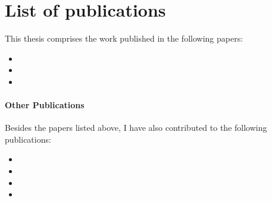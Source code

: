 \section{List of publications\label{sec:publications}}
This thesis comprises the work published in the following papers:

\begin{itemize}
    \item {}
    \item {}
    \item {}
\end{itemize}



\paragraph{Other Publications} Besides the papers listed above, I have also
contributed to the following publications:

\begin{itemize}
    \item {}
    \item {}
    \item {}
    \item {}
\end{itemize}